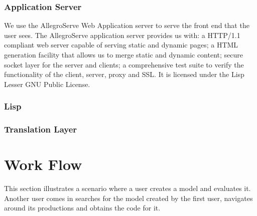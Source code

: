 
\subsubsection{Application Server}

We use the AllegroServe Web Application server to serve the front end
that the user sees. The AllegroServe\cite{aserve2009} application server provides us
with: a HTTP/1.1 compliant web server capable of serving static and
dynamic pages; a HTML generation facility that allows us to merge
static and dynamic content; secure socket layer for the server and
clients; a comprehensive test suite to verify the functionality of the
client, server, proxy and SSL. It is licensed under the Lisp Lesser
GNU Public License. 

\subsubsection{Lisp}


\subsubsection{Translation Layer}



\section{Work Flow}

This section illustrates a scenario where a user creates a model and
evaluates it. Another user comes in searches for the model created by
the first user, navigates around its productions and obtains the code for
it. 


